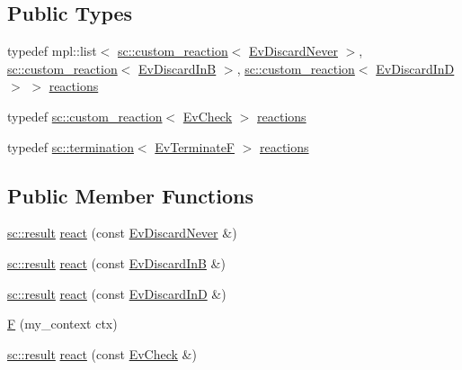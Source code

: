 \subsection*{Public Types}
\begin{DoxyCompactItemize}
\item 
typedef mpl\+::list$<$ \mbox{\hyperlink{classboost_1_1statechart_1_1custom__reaction}{sc\+::custom\+\_\+reaction}}$<$ \mbox{\hyperlink{struct_ev_discard_never}{Ev\+Discard\+Never}} $>$, \mbox{\hyperlink{classboost_1_1statechart_1_1custom__reaction}{sc\+::custom\+\_\+reaction}}$<$ \mbox{\hyperlink{struct_ev_discard_in_b}{Ev\+Discard\+InB}} $>$, \mbox{\hyperlink{classboost_1_1statechart_1_1custom__reaction}{sc\+::custom\+\_\+reaction}}$<$ \mbox{\hyperlink{struct_ev_discard_in_d}{Ev\+Discard\+InD}} $>$ $>$ \mbox{\hyperlink{struct_f_a70eacc9bcbabcf07fc24f5a7fefce855}{reactions}}
\item 
typedef \mbox{\hyperlink{classboost_1_1statechart_1_1custom__reaction}{sc\+::custom\+\_\+reaction}}$<$ \mbox{\hyperlink{struct_ev_check}{Ev\+Check}} $>$ \mbox{\hyperlink{struct_f_a476174f8a8927114c00816d11877c50f}{reactions}}
\item 
typedef \mbox{\hyperlink{classboost_1_1statechart_1_1termination}{sc\+::termination}}$<$ \mbox{\hyperlink{struct_ev_terminate_f}{Ev\+TerminateF}} $>$ \mbox{\hyperlink{struct_f_add001eab83d0f8cff9a94bf6447c5aa1}{reactions}}
\end{DoxyCompactItemize}
\subsection*{Public Member Functions}
\begin{DoxyCompactItemize}
\item 
\mbox{\hyperlink{namespaceboost_1_1statechart_abe807f6598b614d6d87bb951ecd92331}{sc\+::result}} \mbox{\hyperlink{struct_f_a376e5c76bdfdf428aba4503daec98e41}{react}} (const \mbox{\hyperlink{struct_ev_discard_never}{Ev\+Discard\+Never}} \&)
\item 
\mbox{\hyperlink{namespaceboost_1_1statechart_abe807f6598b614d6d87bb951ecd92331}{sc\+::result}} \mbox{\hyperlink{struct_f_abe8ebe7d32d3149a3c8623245b4c5c42}{react}} (const \mbox{\hyperlink{struct_ev_discard_in_b}{Ev\+Discard\+InB}} \&)
\item 
\mbox{\hyperlink{namespaceboost_1_1statechart_abe807f6598b614d6d87bb951ecd92331}{sc\+::result}} \mbox{\hyperlink{struct_f_a31458675be8c5ab2c2bfb59512386c72}{react}} (const \mbox{\hyperlink{struct_ev_discard_in_d}{Ev\+Discard\+InD}} \&)
\item 
\mbox{\hyperlink{struct_f_a613aac0315d872eeea069e96de81e13a}{F}} (my\+\_\+context ctx)
\item 
\mbox{\hyperlink{namespaceboost_1_1statechart_abe807f6598b614d6d87bb951ecd92331}{sc\+::result}} \mbox{\hyperlink{struct_f_ac04f4d9a86f61f20b462cd4e33aff19a}{react}} (const \mbox{\hyperlink{struct_ev_check}{Ev\+Check}} \&)
\end{DoxyCompactItemize}
